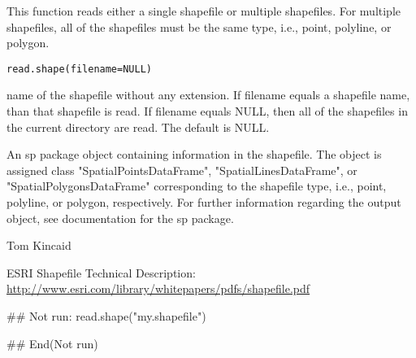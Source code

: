 \begin{Description}\relax
This function reads either a single shapefile or multiple shapefiles.  For 
multiple shapefiles, all of the shapefiles must be the same type, i.e., 
point, polyline, or polygon.
\end{Description}
\begin{Usage}
\begin{verbatim}
read.shape(filename=NULL)
\end{verbatim}
\end{Usage}
\begin{Arguments}
\begin{ldescription}
\item[\code{filename}] name of the shapefile without any extension.  If filename 
equals a shapefile name, than that shapefile is read.  If filename 
equals NULL, then all of the shapefiles in the current directory are 
read.  The default is NULL.
\end{ldescription}
\end{Arguments}
\begin{Value}
An sp package object containing information in the shapefile.  The object is
assigned class "SpatialPointsDataFrame", "SpatialLinesDataFrame", or
"SpatialPolygonsDataFrame" corresponding to the shapefile type, i.e., point,
polyline, or polygon, respectively.  For further information regarding the
output object, see documentation for the sp package.
\end{Value}
\begin{Author}\relax
Tom Kincaid 
\end{Author}
\begin{References}\relax
ESRI Shapefile Technical Description: 
\url{http://www.esri.com/library/whitepapers/pdfs/shapefile.pdf}
\end{References}
\begin{SeeAlso}\relax
{}
\end{SeeAlso}
\begin{Examples}
\begin{ExampleCode}
  ## Not run: 
  read.shape("my.shapefile")
  
## End(Not run)
\end{ExampleCode}
\end{Examples}

